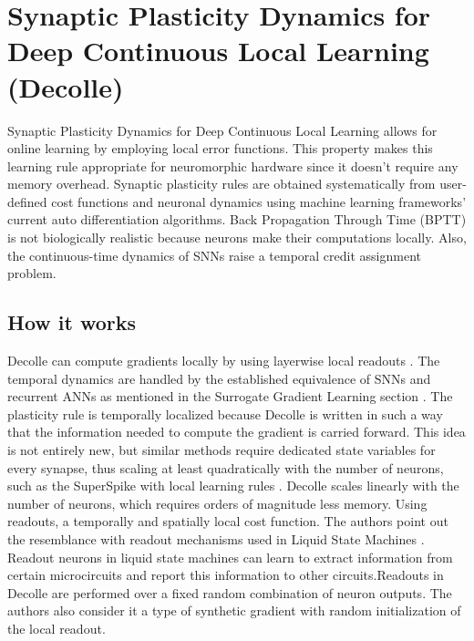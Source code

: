 \documentclass[12pt]{report}
\begin{document}
\section{Synaptic Plasticity Dynamics for Deep Continuous Local Learning (Decolle)}
Synaptic Plasticity Dynamics for Deep Continuous Local Learning \cite{kaiser2020} allows for online learning by employing local error functions. This property makes this learning rule appropriate for neuromorphic hardware since it doesn't require any memory overhead. Synaptic plasticity rules are obtained systematically from user-defined cost functions and neuronal dynamics using machine learning frameworks' current auto differentiation algorithms. Back Propagation Through Time (BPTT) is not biologically realistic because neurons make their computations locally. Also, the continuous-time dynamics of SNNs raise a temporal credit assignment problem.
\subsection{How it works}
Decolle can compute gradients locally by using layerwise local readouts \cite{neftci2017}. The temporal dynamics are handled by the established equivalence of SNNs and recurrent ANNs as mentioned in the Surrogate Gradient Learning section \cite{neft2019}. The plasticity rule is temporally localized because Decolle is written in such a way that the information needed to compute the gradient is carried forward. This idea is not entirely new, but similar methods require dedicated state variables for every synapse, thus scaling at least quadratically with the number of neurons, such as the SuperSpike with local learning rules . Decolle scales linearly with the number of neurons, which requires orders of magnitude less memory. Using readouts, a temporally and spatially local cost function. The authors point out the resemblance with readout mechanisms used in Liquid State Machines \cite{markram2002}. Readout neurons in liquid state machines can learn to extract information from certain microcircuits and report this information to other circuits.Readouts in Decolle are performed over a fixed random combination of neuron outputs. The authors also consider it a type of synthetic gradient with random initialization of the local readout.
\end{document}
